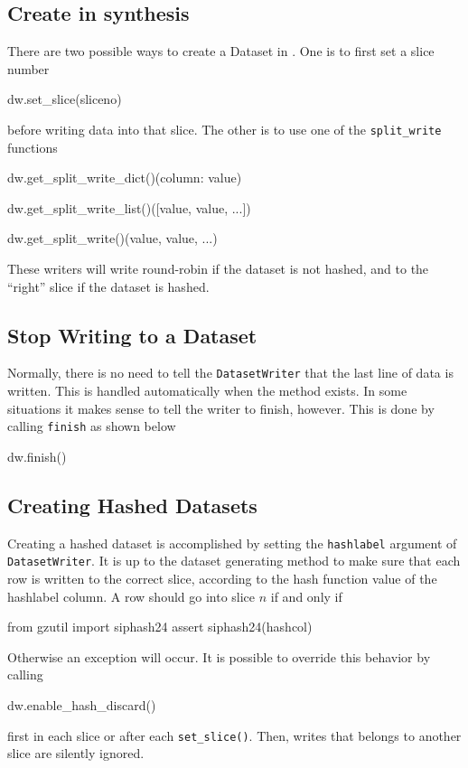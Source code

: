 \subsection{Create in synthesis}

There are two possible ways to create a Dataset in \synthesis.  One is
to first set a slice number
\begin{python}
dw.set_slice(sliceno)
\end{python}
before writing data into that slice.  The other is to use one of
the \texttt{split\_write} functions
\begin{python}
dw.get_split_write_dict()({column: value})

dw.get_split_write_list()([value, value, ...])

dw.get_split_write()(value, value, ...)
\end{python}
These writers will write round-robin if the dataset is not hashed, and
to the ``right'' slice if the dataset is hashed.



\subsection{Stop Writing to a Dataset}
Normally, there is no need to tell the \texttt{DatasetWriter} that the
last line of data is written.  This is handled automatically when the
method exists.  In some situations it makes sense to tell the writer
to finish, however.  This is done by calling \texttt{finish} as shown
below
\begin{python}
dw.finish()
\end{python}



\subsection{Creating Hashed Datasets}
Creating a hashed dataset is accomplished by setting
the \texttt{hashlabel} argument of \texttt{DatasetWriter}.  It is up
to the dataset generating method to make sure that each row is written
to the correct slice, according to the hash function value of the
hashlabel column.  A row should go into slice $n$ if and only if
\begin{python}
from gzutil import siphash24
assert siphash24(hashcol) %
\end{python}
Otherwise an exception will occur.  It is possible to override this
behavior by calling
\begin{python}
dw.enable_hash_discard()
\end{python}
first in each slice or after each \texttt{set\_slice()}.  Then, writes
that belongs to another slice are silently ignored.



